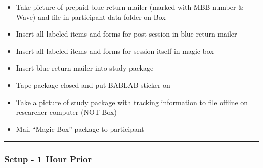 \documentclass[]{book}
\begin{document}
\begin{itemize}
\item
  Take picture of prepaid blue return mailer (marked with MBB number \& Wave) and file in participant data folder on Box
\item
  Insert all labeled items and forms for post-session in blue return mailer
\item
  Insert all labeled items and forms for session itself in magic box
\item
  Insert blue return mailer into study package
\item
  Tape package closed and put BABLAB sticker on
\item
  Take a picture of study package with tracking information to file offline on researcher computer (NOT Box)
\item
  Mail ``Magic Box'' package to participant
\end{itemize}

\begin{center}\rule{0.5\linewidth}{0.5pt}\end{center}

\hypertarget{setup---1-hour-prior}{%
\subsubsection{Setup - 1 Hour Prior}\label{setup---1-hour-prior}}
\end{document}

